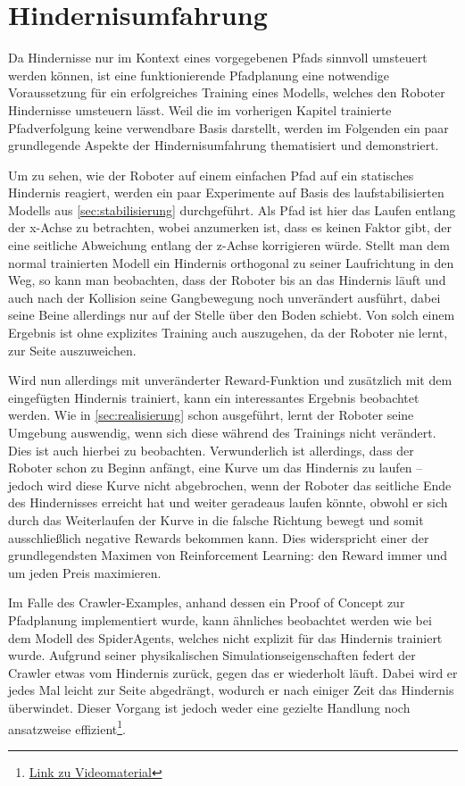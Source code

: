 \section{Hindernisumfahrung}
Da Hindernisse nur im Kontext eines vorgegebenen Pfads sinnvoll umsteuert werden können, ist eine funktionierende Pfadplanung eine notwendige Voraussetzung für ein erfolgreiches Training eines Modells, welches den Roboter Hindernisse umsteuern lässt.
Weil die im vorherigen Kapitel trainierte Pfadverfolgung keine verwendbare Basis darstellt, werden im Folgenden ein paar grundlegende Aspekte der Hindernisumfahrung thematisiert und demonstriert.

Um zu sehen, wie der Roboter auf einem einfachen Pfad auf ein statisches Hindernis reagiert, werden ein paar Experimente auf Basis des laufstabilisierten Modells aus \autoref{sec:stabilisierung} durchgeführt.
Als Pfad ist hier das Laufen entlang der x-Achse zu betrachten, wobei anzumerken ist, dass es keinen Faktor gibt, der eine seitliche Abweichung entlang der z-Achse korrigieren würde.
Stellt man dem normal trainierten Modell ein Hindernis orthogonal zu seiner Laufrichtung in den Weg, so kann man beobachten, dass der Roboter bis an das Hindernis läuft und auch nach der Kollision seine Gangbewegung noch unverändert ausführt, dabei seine Beine allerdings nur auf der Stelle über den Boden schiebt.
Von solch einem Ergebnis ist ohne explizites Training auch auszugehen, da der Roboter nie lernt, zur Seite auszuweichen.

Wird nun allerdings mit unveränderter Reward-Funktion und zusätzlich mit dem eingefügten Hindernis trainiert, kann ein interessantes Ergebnis beobachtet werden.
Wie in \autoref{sec:realisierung} schon ausgeführt, lernt der Roboter seine Umgebung auswendig, wenn sich diese während des Trainings nicht verändert.
Dies ist auch hierbei zu beobachten.
Verwunderlich ist allerdings, dass der Roboter schon zu Beginn anfängt, eine Kurve um das Hindernis zu laufen -- jedoch wird diese Kurve nicht abgebrochen, wenn der Roboter das seitliche Ende des Hindernisses erreicht hat und weiter geradeaus laufen könnte, obwohl er sich durch das Weiterlaufen der Kurve in die falsche Richtung bewegt und somit ausschließlich negative Rewards bekommen kann.
Dies widerspricht einer der grundlegendsten Maximen von Reinforcement Learning: den Reward immer und um jeden Preis maximieren.

Im Falle des Crawler-Examples, anhand dessen ein Proof of Concept zur Pfadplanung implementiert wurde, kann ähnliches beobachtet werden wie bei dem Modell des SpiderAgents, welches nicht explizit für das Hindernis trainiert wurde.
Aufgrund seiner physikalischen Simulationseigenschaften federt der Crawler etwas vom Hindernis zurück, gegen das er wiederholt läuft.
Dabei wird er jedes Mal leicht zur Seite abgedrängt, wodurch er nach einiger Zeit das Hindernis überwindet.
Dieser Vorgang ist jedoch weder eine gezielte Handlung noch ansatzweise effizient\footnote{\href{https://github.com/yschiebelhut/studienarbeit-doc/raw/master/Videos/crawler-obstacle.webm}{Link zu Videomaterial}}.

